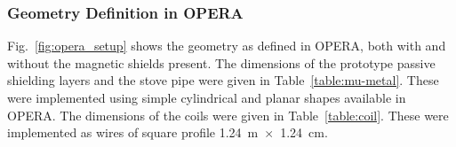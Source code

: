 





\subsubsection{Geometry Definition in OPERA}


Fig.~\ref{fig:opera_setup} shows the geometry as defined in OPERA,
both with and without the magnetic shields present.  The dimensions of
the prototype passive shielding layers and the stove pipe were given
in Table~\ref{table:mu-metal}.  These were implemented using simple
cylindrical and planar shapes available in OPERA.  The dimensions of
the coils were given in Table~\ref{table:coil}.  These were
implemented as wires of square profile 1.24~m~$\times$~1.24~cm.


